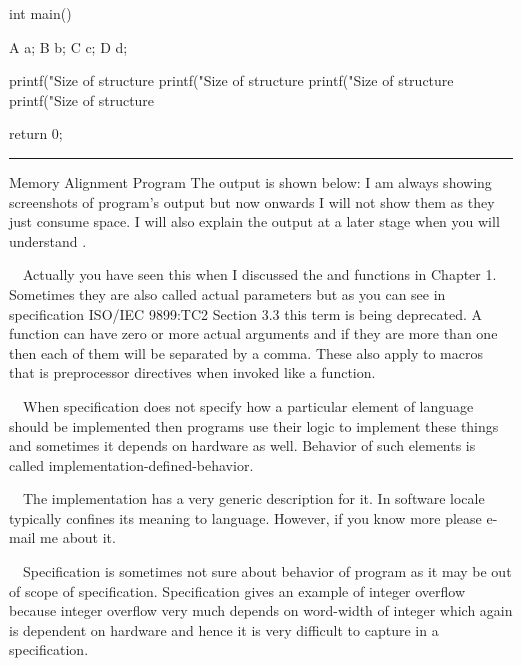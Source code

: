 int main()
{
  A a;
  B b;
  C c;
  D d;

  printf("Size of structure %
  printf("Size of structure %
  printf("Size of structure %
  printf("Size of structure %

  return 0;
}

\stopCPP
{}
\hrule\blank[force,1mm]
\startalignment[middle]
Memory Alignment Program
\stopalignment
The output is shown below:
\blank[force, 1mm]
I am always showing screenshots of program's output but now onwards I
will not show them as they just consume space. I will also explain the
output at a later stage when you will understand .
\item{}\textreference[argument]~~Actually you have seen
  this when I discussed the  and  functions
  in Chapter 1. Sometimes they are also called actual parameters but
  as you can see in specification ISO/IEC 9899:TC2 Section 3.3 this
  term is being deprecated. A function can have zero or more actual
  arguments and if they are more than one then each of them will be
  separated by a comma. These also apply to macros that is
  preprocessor directives when invoked like a function.
\item{}~~When
  specification does not specify how a particular element of language
  should be implemented then programs use their logic to implement
  these things and sometimes it depends on hardware as well. Behavior
  of such elements is called implementation-defined-behavior.
\item{}~~The
  implementation has a very generic description for it. In software
  locale typically confines its meaning to language. However, if you
  know more please e-mail me about it.
\item{}~~Specification
  is sometimes not sure about behavior of program as it may be out of
  scope of specification. Specification gives an example of integer
  overflow because integer overflow very much depends on word-width of
  integer which again is dependent on hardware and hence it is very
  difficult to capture in a specification.
